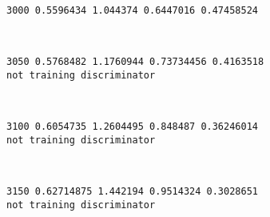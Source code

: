 \documentclass[11pt]{article}
\begin{document}
    \begin{Verbatim}[commandchars=\\\{\}]
3000 0.5596434 1.044374 0.6447016 0.47458524

    \end{Verbatim}

    \begin{center}
    \end{center}
    { \hspace*{\fill} \\}
    
    \begin{Verbatim}[commandchars=\\\{\}]
3050 0.5768482 1.1760944 0.73734456 0.4163518
not training discriminator

    \end{Verbatim}

    \begin{center}
    \end{center}
    { \hspace*{\fill} \\}
    
    \begin{Verbatim}[commandchars=\\\{\}]
3100 0.6054735 1.2604495 0.848487 0.36246014
not training discriminator

    \end{Verbatim}

    \begin{center}
    \end{center}
    { \hspace*{\fill} \\}
    
    \begin{Verbatim}[commandchars=\\\{\}]
3150 0.62714875 1.442194 0.9514324 0.3028651
not training discriminator

    \end{Verbatim}

    \begin{center}
    \end{center}
    { \hspace*{\fill} \\}
    
\end{document}
